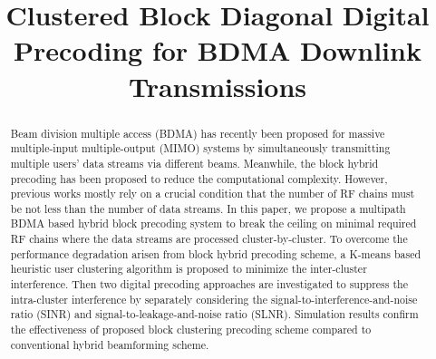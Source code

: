 \documentclass[conference]{IEEEtran}
\begin{document}
\title{Clustered Block Diagonal Digital Precoding for BDMA Downlink Transmissions}
\author{}
\maketitle\thispagestyle{plain}\pagestyle{plain}

\begin{abstract}
Beam division multiple access (BDMA) has recently been proposed for massive multiple-input multiple-output (MIMO) systems by simultaneously transmitting multiple users' data streams via different beams. Meanwhile, the block hybrid precoding has been proposed to reduce the computational complexity. However, previous works mostly rely on a crucial condition that the number of RF chains must be not less than the number of data streams. In this paper, we propose a multipath BDMA based hybrid block precoding system to break the ceiling on minimal required RF chains where the data streams are processed cluster-by-cluster. To overcome the performance degradation arisen from block hybrid precoding scheme, a K-means based heuristic user clustering algorithm is proposed to minimize the inter-cluster interference. Then two digital precoding approaches are investigated to suppress the intra-cluster interference by separately considering the signal-to-interference-and-noise ratio (SINR) and signal-to-leakage-and-noise ratio (SLNR). Simulation results confirm the effectiveness of proposed block clustering precoding scheme compared to conventional hybrid beamforming scheme.
\end{abstract}
\end{document}
